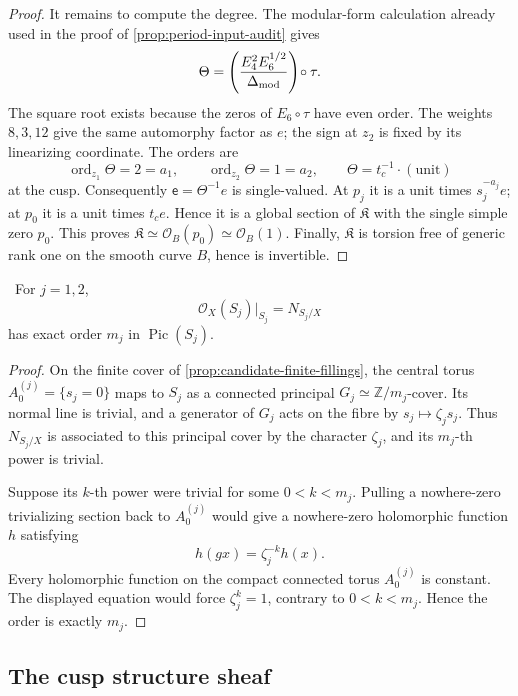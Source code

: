 \begin{proof}
It remains to compute the degree.  The modular-form calculation already
used in the proof of \cref{prop:period-input-audit} gives
\[
 \Theta=
 \left(\frac{E_4^2E_6^{1/2}}{\Delta_{\rm mod}}\right)\!\circ\tau.
\]
The square root exists because the zeros of \(E_6\circ\tau\) have even
order.  The weights \(8,3,12\) give the same automorphy factor as \(e\);
the sign at \(z_2\) is fixed by its linearizing coordinate.  The orders are
\[
 \operatorname{ord}_{z_1}\Theta=2=a_1,\qquad
 \operatorname{ord}_{z_2}\Theta=1=a_2,\qquad
 \Theta=t_c^{-1}\cdot(\text{unit})
\tag{9.6}
\]
at the cusp.  Consequently \(\mathsf e=\Theta^{-1}e\) is single-valued.
At \(p_j\) it is a unit times \(s_j^{-a_j}e\); at \(p_0\) it is a unit
times \(t_ce\).  Hence it is a global section of \(\mathfrak K\) with the
single simple zero \(p_0\).  This proves
\(\mathfrak K\simeq\mathcal O_B(p_0)\simeq\mathcal O_B(1)\).
Finally, \(\mathfrak K\) is torsion free of generic rank one on the smooth
curve \(B\), hence is invertible.
\end{proof}

\begin{lemma}
\label{lem:finite-normal-order-audit}
\Verified\ For \(j=1,2\),
\[
 \mathcal O_X(S_j)|_{S_j}=N_{S_j/X}
\]
has exact order \(m_j\) in \(\operatorname{Pic}(S_j)\).
\end{lemma}

\begin{proof}
On the finite cover of \cref{prop:candidate-finite-fillings}, the central
torus \(A_0^{(j)}=\{s_j=0\}\) maps to \(S_j\) as a connected principal
\(G_j\simeq\mathbb Z/m_j\)-cover.  Its normal line is trivial, and a
generator of \(G_j\) acts on the fibre by
\(s_j\mapsto\zeta_js_j\).  Thus \(N_{S_j/X}\) is associated to this
principal cover by the character \(\zeta_j\), and its \(m_j\)-th power is
trivial.

Suppose its \(k\)-th power were trivial for some \(0<k<m_j\).  Pulling a
nowhere-zero trivializing section back to \(A_0^{(j)}\) would give a
nowhere-zero holomorphic function \(h\) satisfying
\[
 h(gx)=\zeta_j^{-k}h(x).
\]
Every holomorphic function on the compact connected torus \(A_0^{(j)}\)
is constant.  The displayed equation would force \(\zeta_j^k=1\), contrary
to \(0<k<m_j\).  Hence the order is exactly \(m_j\).
\end{proof}

\subsection{The cusp structure sheaf}


